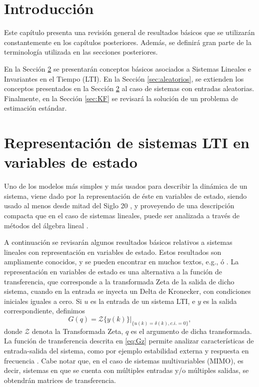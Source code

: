 \section{Introducci\'on}
Este cap\'itulo presenta una revisi\'on general de resultados b\'asicos que se utilizar\'an constantemente en los cap\'itulos posteriores. Adem\'as, se definir\'a gran parte de la terminolog\'ia utilizada en las secciones posteriores. 

En la Secci\'on \ref{sec:LTIVE} se presentar\'an conceptos b\'asicos asociados a Sistemas Lineales e Invariantes en el Tiempo (LTI). En la Secci\'on \ref{sec:aleatorios}, se extienden los conceptos presentados en la Secci\'on \ref{sec:LTIVE} al caso de sistemas con entradas aleatorias. Finalmente, en la Secci\'on \ref{sec:KF} se revisar\'a la soluci\'on de un problema de estimaci\'on est\'andar.

\section{Representaci\'on de sistemas LTI en variables de estado} \label{sec:LTIVE}
Uno de los modelos m\'as simples y m\'as usados para describir la din\'amica de un sistema, viene dado por la representaci\'on de \'este en variables de estado, siendo usado al menos desde mitad del Siglo 20 \cite{alpay2005state}, y proveyendo de una descripci\'on compacta que en el caso de sistemas lineales, puede ser analizada a trav\'es de m\'etodos del \'algebra lineal \cite{zhdogl96}. 

A continuaci\'on se revisar\'an algunos resultados b\'asicos relativos a sistemas lineales con representaci\'on en variables de estado. Estos resultados son ampliamente conocidos, y se pueden encontrar en muchos textos, e.g., \cite{gogrsa01} \'o \cite{kirk2004optimal}. La representaci\'on en variables de estado es una alternativa a la funci\'on de transferencia, que corresponde a la transformada Zeta de la salida de dicho sistema, cuando en la entrada se inyecta un Delta de Kronecker, con condiciones iniciales iguales a cero. Si $u$ es la entrada de un sistema LTI, e $y$ es la salida correspondiente, definimos
\begin{equation}\label{eq:Gz}
G(q) = \mathcal{Z}\{y(k)\}|_{\{u(k)=\delta(k),c.i.=0\}},
\end{equation}
donde $\mathcal{Z}$ denota la Transformada Zeta, $q$ es el argumento de dicha transformada. La funci\'on de transferencia descrita en \eqref{eq:Gz} permite analizar caracter\'isticas de entrada-salida del sistema, como por ejemplo estabilidad externa y respuesta en frecuencia \cite{gogrsa01}. Cabe notar que, en el caso de sistemas multivariables (MIMO), es decir, sistemas en que se cuenta con m\'ultiples entradas y/o m\'ultiples salidas, se obtendr\'an matrices de transferencia. 

